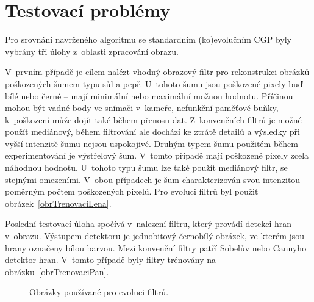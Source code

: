 \section{Testovací problémy}

Pro srovnání navrženého algoritmu se standardním (ko)evolučním CGP byly vybrány tři úlohy z~oblasti zpracování obrazu.

V~prvním případě je cílem nalézt vhodný obrazový filtr pro rekonstrukci obrázků poškozených šumem typu sůl a pepř. U~tohoto šumu jsou poškozené pixely buď bílé nebo černé -- mají minimální nebo maximální možnou hodnotu. Příčinou mohou být vadné body ve snímači v~kameře, nefunkční paměťové buňky, k~poškození může dojít také během přenosu dat. Z~konvenčních filtrů je možné použít mediánový, během filtrování ale dochází ke ztrátě detailů a výsledky při vyšší intenzitě šumu nejsou uspokojivé. Druhým typem šumu použitém během experimentování je výstřelový šum. V~tomto případě mají poškozené pixely zcela náhodnou hodnotu. U~tohoto typu šumu lze také použít mediánový filtr, se stejnými omezeními. V~obou případech je šum charakterizován svou intenzitou -- poměrným počtem poškozených pixelů. Pro evoluci filtrů byl použit obrázek~\ref{obrTrenovaciLena}.

Poslední testovací úloha spočívá v~nalezení filtru, který provádí detekci hran v~obrazu. Výstupem detektoru je jednobitový černobílý obrázek, ve kterém jsou hrany označeny bílou barvou. Mezi konvenční filtry patří Sobelův nebo Cannyho detektor hran. V~tomto případě byly filtry trénovány na obrázku~\ref{obrTrenovaciPan}.

\begin{figure}[htb]
    \centering
    \caption{Obrázky používané pro evoluci filtrů.}
    \label{obrTrenovaci}
\end{figure}


